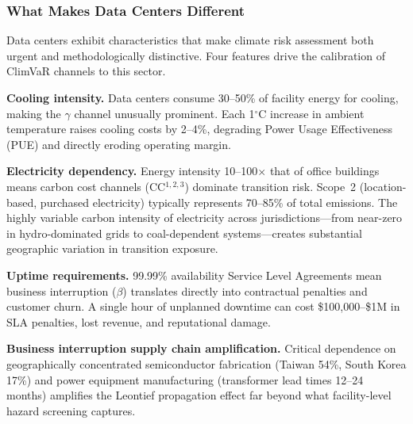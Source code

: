 \begin{twocolbody}

\subsubsection*{What Makes Data Centers Different}\label{toc:different}

Data centers exhibit characteristics that make climate risk assessment both urgent and methodologically distinctive. Four features drive the calibration of ClimVaR channels to this sector.

\textbf{Cooling intensity.} Data centers consume 30--50\% of facility energy for cooling, making the $\gamma$ channel unusually prominent. Each 1$^\circ$C increase in ambient temperature raises cooling costs by 2--4\%, degrading Power Usage Effectiveness (PUE) and directly eroding operating margin.

\textbf{Electricity dependency.} Energy intensity 10--100$\times$ that of office buildings means carbon cost channels (CC$^{1,2,3}$) dominate transition risk. Scope~2 (location-based, purchased electricity) typically represents 70--85\% of total emissions. The highly variable carbon intensity of electricity across jurisdictions---from near-zero in hydro-dominated grids to coal-dependent systems---creates substantial geographic variation in transition exposure.

\textbf{Uptime requirements.} 99.99\% availability Service Level Agreements mean business interruption ($\beta$) translates directly into contractual penalties and customer churn. A single hour of unplanned downtime can cost \$100{,}000--\$1M in SLA penalties, lost revenue, and reputational damage.

\textbf{Business interruption supply chain amplification.} Critical dependence on geographically concentrated semiconductor fabrication (Taiwan 54\%, South Korea 17\%) and power equipment manufacturing (transformer lead times 12--24 months) amplifies the Leontief propagation effect far beyond what facility-level hazard screening captures.

\end{twocolbody}

\vspace{2mm}

